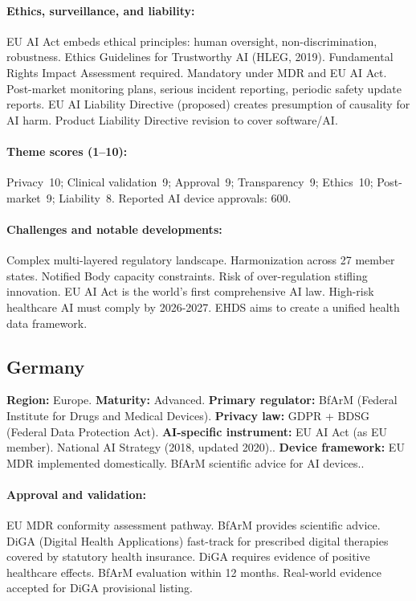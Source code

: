{\paragraph{Ethics, surveillance, and liability:}
EU AI Act embeds ethical principles: human oversight, non-discrimination, robustness. Ethics Guidelines for Trustworthy AI (HLEG, 2019). Fundamental Rights Impact Assessment required.
Mandatory under MDR and EU AI Act. Post-market monitoring plans, serious incident reporting, periodic safety update reports.
EU AI Liability Directive (proposed) creates presumption of causality for AI harm. Product Liability Directive revision to cover software/AI.

\paragraph{Theme scores (1--10):}
Privacy~10;
Clinical validation~9;
Approval~9;
Transparency~9;
Ethics~10;
Post-market~9;
Liability~8.
Reported AI device approvals: 600.

\paragraph{Challenges and notable developments:}
Complex multi-layered regulatory landscape. Harmonization across 27 member states. Notified Body capacity constraints. Risk of over-regulation stifling innovation.
EU AI Act is the world's first comprehensive AI law. High-risk healthcare AI must comply by 2026-2027. EHDS aims to create a unified health data framework.


\subsection{Germany}
\textbf{Region:} Europe.
\textbf{Maturity:} Advanced.
\textbf{Primary regulator:} BfArM (Federal Institute for Drugs and Medical Devices).
\textbf{Privacy law:} GDPR + BDSG (Federal Data Protection Act).
\textbf{AI-specific instrument:} EU AI Act (as EU member). National AI Strategy (2018, updated 2020)..
\textbf{Device framework:} EU MDR implemented domestically. BfArM scientific advice for AI devices..

\paragraph{Approval and validation:}
EU MDR conformity assessment pathway. BfArM provides scientific advice. DiGA (Digital Health Applications) fast-track for prescribed digital therapies covered by statutory health insurance.
DiGA requires evidence of positive healthcare effects. BfArM evaluation within 12 months. Real-world evidence accepted for DiGA provisional listing.

}
